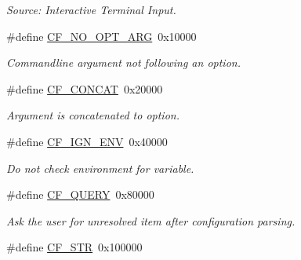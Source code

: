 \begin{DoxyCompactItemize}
\begin{DoxyCompactList}\small\item\em Source\-: Interactive Terminal Input. \end{DoxyCompactList}\item 
\hypertarget{group__special__options__mask_ga97d17b070dac10c14d3930c58bfba76f}{\#define \hyperlink{group__special__options__mask_ga97d17b070dac10c14d3930c58bfba76f}{C\-F\-\_\-\-N\-O\-\_\-\-O\-P\-T\-\_\-\-A\-R\-G}~0x10000}\label{group__special__options__mask_ga97d17b070dac10c14d3930c58bfba76f}

\begin{DoxyCompactList}\small\item\em Commandline argument not following an option. \end{DoxyCompactList}\item 
\hypertarget{group__special__options__mask_ga9e526dae88bf6803772107ff283637b5}{\#define \hyperlink{group__special__options__mask_ga9e526dae88bf6803772107ff283637b5}{C\-F\-\_\-\-C\-O\-N\-C\-A\-T}~0x20000}\label{group__special__options__mask_ga9e526dae88bf6803772107ff283637b5}

\begin{DoxyCompactList}\small\item\em Argument is concatenated to option. \end{DoxyCompactList}\item 
\hypertarget{group__special__options__mask_ga72b75851880f36aaa5a52fdfe7960cca}{\#define \hyperlink{group__special__options__mask_ga72b75851880f36aaa5a52fdfe7960cca}{C\-F\-\_\-\-I\-G\-N\-\_\-\-E\-N\-V}~0x40000}\label{group__special__options__mask_ga72b75851880f36aaa5a52fdfe7960cca}

\begin{DoxyCompactList}\small\item\em Do not check environment for variable. \end{DoxyCompactList}\item 
\hypertarget{group__special__options__mask_gae39e0d9b4e9af8c6d4b3676783dd26e0}{\#define \hyperlink{group__special__options__mask_gae39e0d9b4e9af8c6d4b3676783dd26e0}{C\-F\-\_\-\-Q\-U\-E\-R\-Y}~0x80000}\label{group__special__options__mask_gae39e0d9b4e9af8c6d4b3676783dd26e0}

\begin{DoxyCompactList}\small\item\em Ask the user for unresolved item after configuration parsing. \end{DoxyCompactList}\item 
\hypertarget{group__special__options__mask_ga64c30a2865061d0c1074bc6ec91e3dcf}{\#define \hyperlink{group__special__options__mask_ga64c30a2865061d0c1074bc6ec91e3dcf}{C\-F\-\_\-\-S\-T\-R}~0x100000}\label{group__special__options__mask_ga64c30a2865061d0c1074bc6ec91e3dcf}


\end{DoxyCompactItemize}
